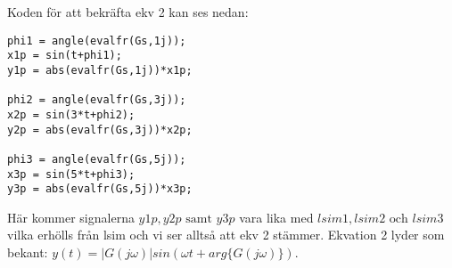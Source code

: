 \clearpage

Koden för att bekräfta ekv 2 kan ses nedan:

\begin{lstlisting}
phi1 = angle(evalfr(Gs,1j));
x1p = sin(t+phi1);
y1p = abs(evalfr(Gs,1j))*x1p;

phi2 = angle(evalfr(Gs,3j));
x2p = sin(3*t+phi2);
y2p = abs(evalfr(Gs,3j))*x2p;

phi3 = angle(evalfr(Gs,5j));
x3p = sin(5*t+phi3);
y3p = abs(evalfr(Gs,5j))*x3p;
\end{lstlisting}

Här kommer signalerna $y1p, y2p \text{ samt } y3p$ vara lika med $lsim1, lsim2 
\text{ och } lsim3$ vilka erhölls från lsim och vi ser alltså att ekv 2
stämmer. Ekvation 2 lyder som bekant: $y(t) = |G(j\omega)|sin(\omega t +
arg\{G(j\omega)\})$.
